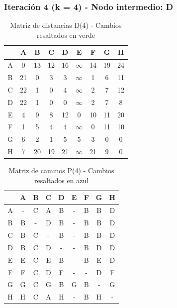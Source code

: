 \documentclass[12pt]{article}
\begin{document}
\clearpage
\subsubsection{Iteración 4 (k = 4) - Nodo intermedio: D}
\begin{table}[h!]
\centering
\begin{tabular}{|c|c|c|c|c|c|c|c|c|}
\hline
 & A & B & C & D & E & F & G & H \\\hline
A & 0 & 13 & 12 & 16 & $\infty$ & 14 & 19 & \cellcolor{lightgreen} 24 \\\hline
B & 21 & 0 & \cellcolor{lightgreen} 3 & 3 & $\infty$ & 1 & 6 & \cellcolor{lightgreen} 11 \\\hline
C & 22 & 1 & 0 & 4 & $\infty$ & 2 & 7 & \cellcolor{lightgreen} 12 \\\hline
D & 22 & 1 & 0 & 0 & $\infty$ & 2 & 7 & 8 \\\hline
E & 4 & 9 & 8 & 12 & 0 & 10 & 11 & \cellcolor{lightgreen} 20 \\\hline
F & 1 & \cellcolor{lightgreen} 5 & \cellcolor{lightgreen} 4 & 4 & $\infty$ & 0 & \cellcolor{lightgreen} 11 & 10 \\\hline
G & 6 & 2 & 1 & 5 & 5 & 3 & 0 & 0 \\\hline
H & 7 & 20 & 19 & 21 & $\infty$ & 21 & 9 & 0 \\\hline
\end{tabular}
\caption{Matriz de distancias D(4) - Cambios resaltados en verde}
\end{table}

\begin{table}[h!]
\centering
\begin{tabular}{|c|c|c|c|c|c|c|c|c|}
\hline
 & A & B & C & D & E & F & G & H \\\hline
A & - & C & A & B & - & B & B & \cellcolor{lightblue} D \\\hline
B & B & - & \cellcolor{lightblue} D & B & - & B & B & \cellcolor{lightblue} D \\\hline
C & B & C & - & B & - & B & B & \cellcolor{lightblue} D \\\hline
D & B & C & D & - & - & B & D & D \\\hline
E & E & C & E & B & - & B & E & \cellcolor{lightblue} D \\\hline
F & F & C & \cellcolor{lightblue} D & F & - & - & \cellcolor{lightblue} D & F \\\hline
G & G & C & G & B & G & B & - & G \\\hline
H & H & C & A & H & - & B & H & - \\\hline
\end{tabular}
\caption{Matriz de caminos P(4) - Cambios resaltados en azul}
\end{table}
\end{document}
